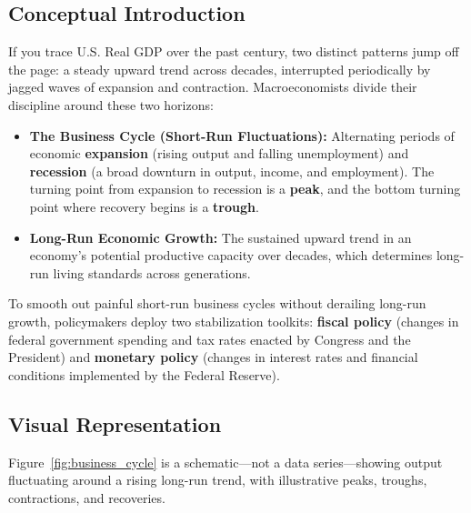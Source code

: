 \documentclass[11pt,letterpaper]{article}
\begin{document}
\subsection*{Conceptual Introduction}
If you trace U.S. Real GDP over the past century, two distinct patterns jump off the page: a steady upward trend across decades, interrupted periodically by jagged waves of expansion and contraction. Macroeconomists divide their discipline around these two horizons:
\begin{itemize}
    \item \textbf{The Business Cycle (Short-Run Fluctuations):} Alternating periods of economic \textbf{expansion} (rising output and falling unemployment) and \textbf{recession} (a broad downturn in output, income, and employment). The turning point from expansion to recession is a \textbf{peak}, and the bottom turning point where recovery begins is a \textbf{trough}.
    \item \textbf{Long-Run Economic Growth:} The sustained upward trend in an economy's potential productive capacity over decades, which determines long-run living standards across generations.
\end{itemize}

To smooth out painful short-run business cycles without derailing long-run growth, policymakers deploy two stabilization toolkits: \textbf{fiscal policy} (changes in federal government spending and tax rates enacted by Congress and the President) and \textbf{monetary policy} (changes in interest rates and financial conditions implemented by the Federal Reserve).

\subsection*{Visual Representation}
Figure~\ref{fig:business_cycle} is a schematic—not a data series—showing output fluctuating around a rising long-run trend, with illustrative peaks, troughs, contractions, and recoveries.
\end{document}
